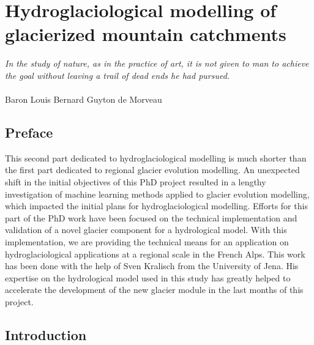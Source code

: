 \chapter{Hydroglaciological modelling of glacierized mountain catchments}
\label{chap:discussion}

\begin{flushright}
\begin{small}
\textit{In the study of nature, as in the practice of art, it is not given to man to achieve the goal without leaving a trail of dead ends he had pursued.}\\ \\
Baron Louis Bernard Guyton de Morveau
\end{small}
\end{flushright}

\section*{Preface}

This second part dedicated to hydroglaciological modelling is much shorter than the first part dedicated to regional glacier evolution modelling. An unexpected shift in the initial objectives of this PhD project resulted in a lengthy investigation of machine learning methods applied to glacier evolution modelling, which impacted the initial plans for hydroglaciological modelling. Efforts for this part of the PhD work have been focused on the technical implementation and validation of a novel glacier component for a hydrological model. With this implementation, we are providing the technical means for an application on hydroglaciological applications at a regional scale in the French Alps. This work has been done with the help of Sven Kralisch from the University of Jena. His expertise on the hydrological model used in this study has greatly helped to accelerate the development of the new glacier module in the last months of this project.

\section{Introduction}

